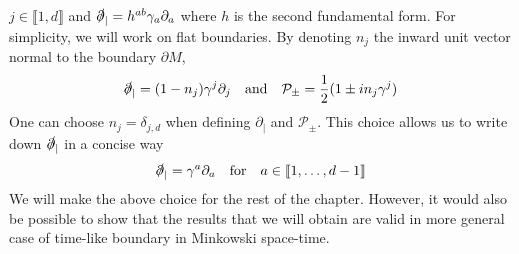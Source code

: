 $j \in \llbracket 1 , d \rrbracket$ and $\slashed{\partial}_| = h^{ab} \gamma_{a} \partial_{a}$ where $h$ is the second fundamental form.
For simplicity, we will work on flat boundaries.
By denoting $n_j$ the inward unit vector normal to the boundary $\partial M$,
\begin{equation*}
\slashed{\partial}_| = (1 - n_j)\gamma^j\partial_j \quad\mathrm{and}\quad
\mathcal{P}_\pm = \frac 1 2 (1\pm i n_j\gamma^j)
\end{equation*}
One can choose $n_j = \delta_{j,d}$ when defining $\partial_|$ and $\mathcal P _\pm$.
This choice allows us to write down $\slashed{\partial}_|$ in a concise way
\begin{equation*}
\slashed \partial_| = \gamma^a\partial_a \quad\mathrm{for}\quad 
a \in \llbracket 1, \ldots, d-1 \rrbracket
\end{equation*}
We will make the above choice for the rest of the chapter. 
However, it would also be possible to show that the results that we will obtain are valid in more general case of time-like boundary in Minkowski space-time.





